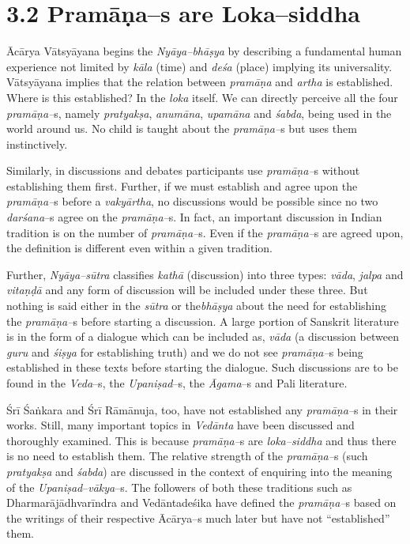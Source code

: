 \section*{3.2 Pramāṇa–s are Loka–siddha}

Ācārya Vātsyāyana begins the \textit{Nyāya–bhāṣya} by describing a fundamental human experience not limited by \textit{kāla }(time) and \textit{deśa }(place) implying its universality. Vātsyāyana implies that the relation between \textit{pramāṇa} and \textit{artha} is established. Where is this established? In the \textit{loka }itself. We can directly perceive all the four \textit{pramāṇa–}s, namely \textit{pratyakṣa}, \textit{anumāna}, \textit{upamāna} and \textit{śabda}, being used in the world around us. No child is taught about the \textit{pramāṇa–}s but uses them instinctively.

Similarly, in discussions and debates participants use \textit{pramāṇa–}s without establishing them first. Further, if we must establish and agree upon the \textit{pramāṇa–}s before a \textit{vakyārtha}, no discussions would be possible since no two \textit{darśana}–s agree on the \textit{pramāṇa–}s. In fact, an important discussion in Indian tradition is on the number of \textit{pramāṇa–}s. Even if the \textit{pramāṇa–}s are agreed upon, the definition is different even within a given tradition.

Further,\textit{ Nyāya–sūtra} classifies \textit{kathā} (discussion) into three types: \textit{vāda}, \textit{jalpa} and \textit{vitaṇḍā} and any form of discussion will be included under these three. But nothing is said either in the \textit{sūtra} or the\textit{bhāṣya }about the need for establishing the \textit{pramāṇa–}s before starting a discussion. A large portion of Sanskrit literature is in the form of a dialogue which can be included as, \textit{vāda }(a discussion between \textit{guru} and \textit{śiṣya} for establishing truth) and we do not see \textit{pramāṇa–}s being established in these texts before starting the dialogue. Such discussions are to be found in the \textit{Veda}–s, the \textit{Upaniṣad}–s, the \textit{Āgama}–s and Pali literature.

Śrī Śaṅkara and Śrī Rāmānuja, too, have not established any \textit{pramāṇa–}s in their works. Still, many important topics in \textit{Vedānta} have been discussed and thoroughly examined. This is because \textit{pramāṇa–}s are \textit{loka–siddha} and thus there is no need to establish them. The relative strength of the \textit{pramāṇa–}s (such \textit{pratyakṣa} and \textit{śabda}) are discussed in the context of enquiring into the meaning of the \textit{Upaniṣad}–\textit{vākya}–s. The followers of both these traditions such as Dharmarājādhvarīndra and Vedāntadeśika have defined the \textit{pramāṇa–}s based on the writings of their respective Ācārya–s much later but have not “established” them.

